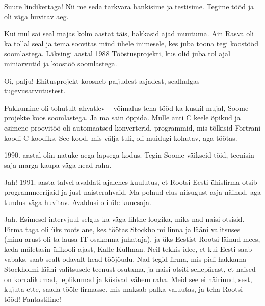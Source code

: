 
Suure lindikettaga! Nii me seda tarkvara hankisime ja testisime. Tegime tööd ja 
oli väga huvitav aeg.

Kui mul sai seal majas kolm aastat täis, hakkasid ajad muutuma. Ain 
Rasva oli ka tollal seal ja tema soovitas mind 
ühele inimesele, kes juba toona tegi koostööd soomlastega. Läksingi aastal 1988 Tööstusprojekti, kus olid juba tol ajal miniarvutid ja koostöö soomlastega. 


Oi, palju! Ehitusprojekt koosneb paljudest asjadest, sealhulgas 
tugevusarvutustest.


Pakkumine oli tohutult ahvatlev -- võimalus teha tööd ka kuskil mujal, 
Soome projekte koos 
soomlastega. Ja ma sain õppida. Mulle anti C keele õpikud ja 
esimene proovitöö oli automaatsed konverterid, programmid, mis tõlkisid
Fortrani koodi C koodiks. See kood, mis 
välja tuli, oli muidugi kohutav, aga töötas. 

1990. aastal olin natuke aega lapsega kodus. Tegin Soome väikseid töid, teenisin 
saja marga kaupa väga head raha. 


Jah! 1991. aasta talvel avaldati ajalehes 
kuulutus, et Rootsi-Eesti ühisfirma otsib programmeerijaid ja just naisterahvaid. Ma polnud elus niisugust asja näinud, aga tundus väga 
huvitav. Avaldusi oli üle kuuesaja. 


Jah. Esimesel intervjuul selgus ka väga lihtne loogika, miks nad naisi 
otsisid. Firma taga oli üks rootslane, kes töötas Stockholmi linna ja 
lääni valitsuses (minu arust oli ta lausa IT osakonna juhataja), ja üks Eestist Rootsi läinud mees, keda mäletasin ülikooli ajast, 
Kalle Kullman. Neil tekkis idee, et kui Eesti saab 
vabaks, saab sealt odavalt head tööjõudu. Nad tegid firma, mis pidi hakkama 
Stockholmi lääni valitsusele teenust osutama, ja naisi otsiti sellepärast, et 
naised on korralikumad, leplikumad ja küsivad vähem raha. Meid see 
ei häirinud, sest, kujuta ette, saada tööle firmasse, mis maksab palka 
valuutas, ja teha Rootsi tööd! Fantastiline!

